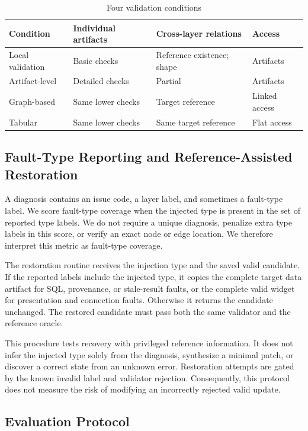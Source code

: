 \documentclass[manuscript,review,anonymous]{acmart}
\begin{document}
\begin{table}[t]
  \caption{Four validation conditions}
  \label{tab:conditions}
  \begin{tabularx}{\linewidth}{lYYY}
    \toprule
    Condition & Individual artifacts & Cross-layer relations & Access \\
    \midrule
    Local validation & Basic checks & Reference existence; shape & Artifacts \\
    Artifact-level & Detailed checks & Partial & Artifacts \\
    Graph-based & Same lower checks & Target reference & Linked access \\
    Tabular & Same lower checks & Same target reference & Flat access \\
    \bottomrule
  \end{tabularx}
\end{table}

\subsection{Fault-Type Reporting and Reference-Assisted Restoration}

A diagnosis contains an issue code, a layer label, and sometimes a fault-type label. We score fault-type coverage when the injected type is present in the set of reported type labels. We do not require a unique diagnosis, penalize extra type labels in this score, or verify an exact node or edge location. We therefore interpret this metric as fault-type coverage.

The restoration routine receives the injection type and the saved valid candidate. If the reported labels include the injected type, it copies the complete target data artifact for SQL, provenance, or stale-result faults, or the complete valid widget for presentation and connection faults. Otherwise it returns the candidate unchanged. The restored candidate must pass both the same validator and the reference oracle.

This procedure tests recovery with privileged reference information. It does not infer the injected type solely from the diagnosis, synthesize a minimal patch, or discover a correct state from an unknown error. Restoration attempts are gated by the known invalid label and validator rejection. Consequently, this protocol does not measure the risk of modifying an incorrectly rejected valid update.

\subsection{Evaluation Protocol}
\end{document}
